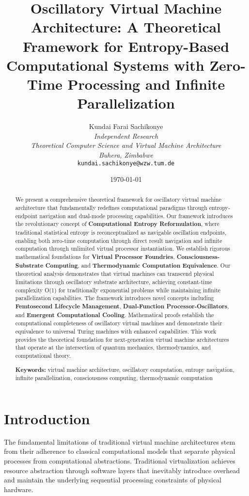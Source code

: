 \documentclass[12pt,a4paper]{article}
\title{\textbf{Oscillatory Virtual Machine Architecture: A Theoretical Framework for Entropy-Based Computational Systems with Zero-Time Processing and Infinite Parallelization}}
\author{
Kundai Farai Sachikonye\\
\textit{Independent Research}\\
\textit{Theoretical Computer Science and Virtual Machine Architecture}\\
\textit{Buhera, Zimbabwe}\\
\texttt{kundai.sachikonye@wzw.tum.de}
}
\date{\today}
\begin{document}
\maketitle

\begin{abstract}
We present a comprehensive theoretical framework for oscillatory virtual machine architecture that fundamentally redefines computational paradigms through entropy-endpoint navigation and dual-mode processing capabilities. Our framework introduces the revolutionary concept of \textbf{Computational Entropy Reformulation}, where traditional statistical entropy is reconceptualized as navigable oscillation endpoints, enabling both zero-time computation through direct result navigation and infinite computation through unlimited virtual processor instantiation. We establish rigorous mathematical foundations for \textbf{Virtual Processor Foundries}, \textbf{Consciousness-Substrate Computing}, and \textbf{Thermodynamic Computation Equivalence}. Our theoretical analysis demonstrates that virtual machines can transcend physical limitations through oscillatory substrate architecture, achieving constant-time complexity O(1) for traditionally exponential problems while maintaining infinite parallelization capabilities. The framework introduces novel concepts including \textbf{Femtosecond Lifecycle Management}, \textbf{Dual-Function Processor-Oscillators}, and \textbf{Emergent Computational Cooling}. Mathematical proofs establish the computational completeness of oscillatory virtual machines and demonstrate their equivalence to universal Turing machines with enhanced capabilities. This work provides the theoretical foundation for next-generation virtual machine architectures that operate at the intersection of quantum mechanics, thermodynamics, and computational theory.

\textbf{Keywords:} virtual machine architecture, oscillatory computation, entropy navigation, infinite parallelization, consciousness computing, thermodynamic computation
\end{abstract}

\section{Introduction}

The fundamental limitations of traditional virtual machine architectures stem from their adherence to classical computational models that separate physical processes from computational abstractions. Traditional virtualization achieves resource abstraction through software layers that inevitably introduce overhead and maintain the underlying sequential processing constraints of physical hardware.
\end{document}
